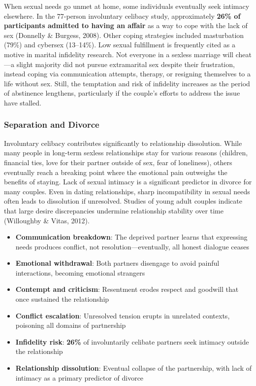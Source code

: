 \documentclass[12pt, letterpaper]{article}
\begin{document}
When sexual needs go unmet at home, some individuals eventually seek intimacy elsewhere. In the 77-person involuntary celibacy study, approximately \textbf{26\% of participants admitted to having an affair} as a way to cope with the lack of sex (Donnelly \& Burgess, 2008). Other coping strategies included masturbation (79\%) and cybersex (13--14\%). Low sexual fulfillment is frequently cited as a motive in marital infidelity research. Not everyone in a sexless marriage will cheat---a slight majority did not pursue extramarital sex despite their frustration, instead coping via communication attempts, therapy, or resigning themselves to a life without sex. Still, the temptation and risk of infidelity increases as the period of abstinence lengthens, particularly if the couple's efforts to address the issue have stalled.

\subsubsection{Separation and Divorce}

Involuntary celibacy contributes significantly to relationship dissolution. While many people in long-term sexless relationships stay for various reasons (children, financial ties, love for their partner outside of sex, fear of loneliness), others eventually reach a breaking point where the emotional pain outweighs the benefits of staying. Lack of sexual intimacy is a significant predictor in divorce for many couples. Even in dating relationships, sharp incompatibility in sexual needs often leads to dissolution if unresolved. Studies of young adult couples indicate that large desire discrepancies undermine relationship stability over time (Willoughby \& Vitas, 2012).

\begin{itemize}
    \item \textbf{Communication breakdown}: The deprived partner learns that expressing needs produces conflict, not resolution---eventually, all honest dialogue ceases
    \item \textbf{Emotional withdrawal}: Both partners disengage to avoid painful interactions, becoming emotional strangers
    \item \textbf{Contempt and criticism}: Resentment erodes respect and goodwill that once sustained the relationship
    \item \textbf{Conflict escalation}: Unresolved tension erupts in unrelated contexts, poisoning all domains of partnership
    \item \textbf{Infidelity risk}: \textbf{26\%} of involuntarily celibate partners seek intimacy outside the relationship
    \item \textbf{Relationship dissolution}: Eventual collapse of the partnership, with lack of intimacy as a primary predictor of divorce
\end{itemize}
\end{document}
